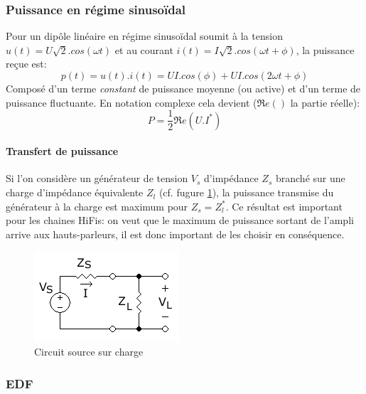 \documentclass[10pt,a4paper]{article}
\begin{document}
\subsubsection{Puissance en régime sinusoïdal}
Pour un dipôle linéaire en régime sinusoïdal soumit à la tension $u(t) = U\sqrt{2}.cos(\omega t)$ et au courant $i(t) = I\sqrt{2}.cos(\omega t + \phi)$, la puissance reçue est:
\begin{equation}
p(t) = u(t).i(t) = UI.cos(\phi) + UI.cos(2\omega t + \phi)
\end{equation}
Composé d'un terme \textit{constant} de puissance moyenne (ou active)  et d'un terme de puissance fluctuante. En notation complexe cela devient ($\Re e()$ la partie réelle): 
\begin{equation}
P = \frac{1}{2} \Re e(U.I^{*})
\end{equation}

\paragraph{Transfert de puissance} Si l'on considère un générateur de tension $V_{s}$ d'impédance $Z_{s}$ branché sur une charge d'impédance équivalente $Z_{l}$ (cf. fugure \ref{fig:impedance_src_chg}), la puissance transmise du générateur à la charge est maximum pour $Z_{s} = Z_{l}^{*}$.  Ce résultat est important pour les chaines HiFis: on veut que le maximum de puissance sortant de l'ampli arrive aux hauts-parleurs, il est donc important de les choisir en conséquence.
\begin{figure}
\centering
\includegraphics[scale=0.5]{Source_and_load_circuit_Z}
\caption{Circuit source sur charge}
\label{fig:impedance_src_chg}
\end{figure}

\subsubsection{EDF}
\end{document}
